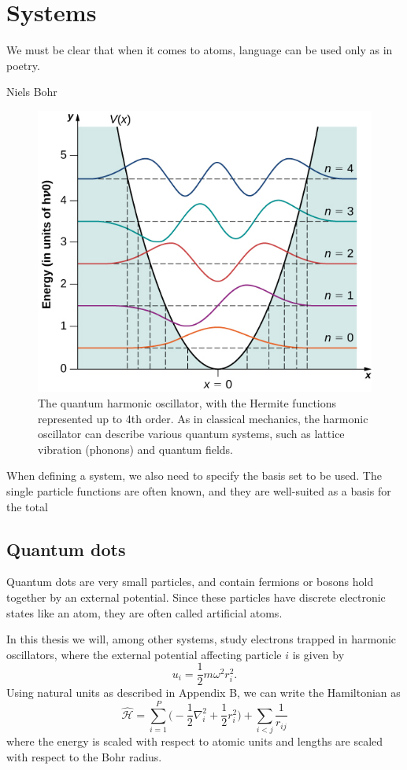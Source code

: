 \chapter{Systems} \label{chp:systems}
\epigraph{We must be clear that when it comes to atoms, language can be used only as in poetry.}{Niels Bohr}
\begin{figure}[H]
	\centering
	\includegraphics[scale=0.9]{Images/qho.jpg}
	\caption{The quantum harmonic oscillator, with the Hermite functions represented up to 4th order. As in classical mechanics, the harmonic oscillator can describe various quantum systems, such as lattice vibration (phonons) and quantum fields.}
	\label{fig:harmonicoscillator}
\end{figure}

When defining a system, we also need to specify the basis set to be used. The single particle functions are often known, and they are well-suited as a basis for the total

\newpage
\section{Quantum dots} \label{subsubsec:quantumdots}
Quantum dots are very small particles, and contain fermions or bosons hold together by an external potential. Since these particles have discrete electronic states like an atom, they are often called artificial atoms. 

In this thesis we will, among other systems, study electrons trapped in harmonic oscillators, where the external potential affecting particle $i$ is given by
\begin{equation}
u_i=\frac{1}{2}m\omega^2r_i^2.
\end{equation}
Using natural units as described in Appendix B, we can write the Hamiltonian as
\begin{equation}
\label{eq:HOHamiltonian}
\hat{\mathcal{H}} = \sum_{i=1}^{P} \Big(-\frac{1}{2} \nabla_i^2 + \frac{1}{2} r_i ^2\Big) + \sum_{i<j} \frac{1}{r_{ij}} 
\end{equation}
where the energy is scaled with respect to atomic units and lengths are scaled with respect to the Bohr radius.

